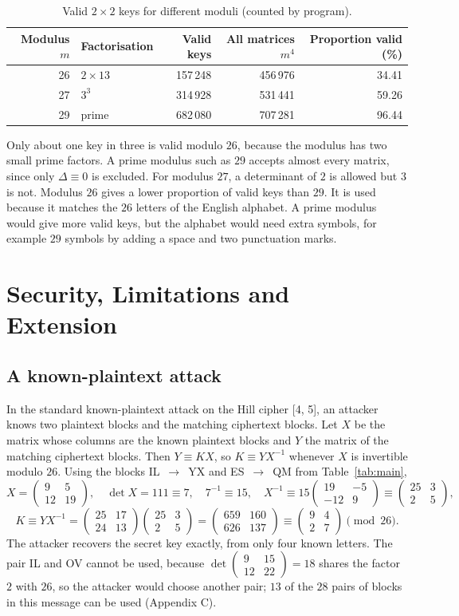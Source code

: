 \documentclass[11pt,a4paper]{article}
\newcommand{\vect}[1]{\begin{pmatrix}#1\end{pmatrix}}
\newcommand{\smat}[1]{\left(\begin{smallmatrix}#1\end{smallmatrix}\right)}
\theoremstyle{plain}
\theoremstyle{definition}
\begin{document}
\begin{table}[ht]
\centering
\small
\caption{Valid $2\times2$ keys for different moduli (counted by program).}
\label{tab:moduli}
\setlength{\tabcolsep}{8pt}
\begin{tabular}{r l r r r}
\toprule
Modulus $m$ & Factorisation & Valid keys & All matrices $m^4$ & Proportion valid (\%)\\
\midrule
26 & $2\times13$ & 157\,248 & 456\,976 & 34.41\\
27 & $3^3$       & 314\,928 & 531\,441 & 59.26\\
29 & prime       & 682\,080 & 707\,281 & 96.44\\
\bottomrule
\end{tabular}
\end{table}

Only about one key in three is valid modulo $26$, because the modulus has two small prime factors. A prime modulus such as $29$ accepts almost every matrix, since only $\Delta\equiv0$ is excluded. For modulus $27$, a determinant of $2$ is allowed but $3$ is not. Modulus $26$ gives a lower proportion of valid keys than $29$. It is used because it matches the $26$ letters of the English alphabet. A prime modulus would give more valid keys, but the alphabet would need extra symbols, for example $29$ symbols by adding a space and two punctuation marks.

\section{Security, Limitations and Extension}\label{sec:security}

\subsection{A known-plaintext attack}

In the standard known-plaintext attack on the Hill cipher [4, 5], an attacker knows two plaintext blocks and the matching ciphertext blocks. Let $X$ be the matrix whose columns are the known plaintext blocks and $Y$ the matrix of the matching ciphertext blocks. Then $Y\equiv KX$, so $K\equiv YX^{-1}$ whenever $X$ is invertible modulo $26$. Using the blocks IL~$\to$~YX and ES~$\to$~QM from Table~\ref{tab:main},
\[
X=\vect{9&5\\12&19},\quad
\det X=111\equiv7,\quad
7^{-1}\equiv15,\quad
X^{-1}\equiv15\vect{19&-5\\-12&9}\equiv\vect{25&3\\2&5},
\]
\[
K\equiv YX^{-1}=\vect{25&17\\24&13}\vect{25&3\\2&5}=\vect{659&160\\626&137}\equiv\vect{9&4\\2&7}\pmod{26}.
\]
The attacker recovers the secret key exactly, from only four known letters. The pair IL and OV cannot be used, because $\det\smat{9&15\\12&22}=18$ shares the factor $2$ with $26$, so the attacker would choose another pair; $13$ of the $28$ pairs of blocks in this message can be used (Appendix C).
\end{document}
